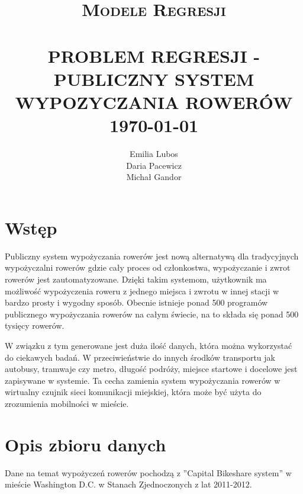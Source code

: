 \documentclass[12pt]{article}
\title{	\normalsize \textsc{Modele Regresji} 	%
		 	\\[2.0cm]								%
			\HRule{0.5pt} \\						%
			\LARGE \textbf{\uppercase{Problem regresji - Publiczny system wypozyczania rowerów}}	%
			\HRule{2pt} \\ [0.5cm]		%
			\normalsize \today			%
		}
\author{
		Emilia Lubos\\
		Daria Pacewicz\\
		Michał Gandor\\		
}
\makeatletter
\def\printtitle{%
    {\centering \@title\par}}
\def\printauthor{%
    {\centering \large \@author}}
\makeatother
\begin{document}
\thispagestyle{empty}		%

\printtitle					%
  	\vfill
\printauthor				%
\section{Wstęp}

\hspace{7mm} Publiczny system wypożyczania rowerów jest nową alternatywą dla tradycyjnych wypożyczalni rowerów gdzie cały proces od członkostwa, wypożyczanie i zwrot rowerów jest zautomatyzowane. Dzięki takim systemom, użytkownik ma możliwość wypożyczenia roweru z jednego miejsca i zwrotu w innej stacji w bardzo prosty i wygodny sposób. Obecnie istnieje ponad 500 programów publicznego wypożyczania rowerów na całym świecie, na to składa się ponad 500 tysięcy rowerów.

W związku z tym generowane jest duża ilość danych, która można wykorzystać do ciekawych badań. W przeciwieństwie do innych środków transportu jak autobusy, tramwaje czy metro, długość podróży, miejsce startowe i docelowe jest zapisywane w systemie. Ta cecha zamienia system wypożyczania rowerów w wirtualny czujnik sieci komunikacji miejskiej, która może być użyta do zrozumienia mobilności w mieście.

\section{Opis zbioru danych}


Dane na temat wypożyczeń rowerów pochodzą z ''Capital Bikeshare system'' w mieście Washington D.C. w Stanach Zjednoczonych z lat 2011-2012. 
\end{document}
